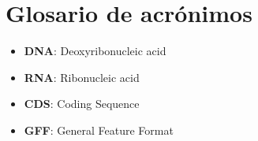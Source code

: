 \chapter*{Glosario de acrónimos}

\begin{itemize}
\item{\textbf{DNA}:  Deoxyribonucleic acid }
\item{\textbf{RNA}:  Ribonucleic acid}
\item{\textbf{CDS}:  Coding Sequence}
\item{\textbf{GFF}: General Feature Format}

\end{itemize}

\newpage \thispagestyle{empty} %

